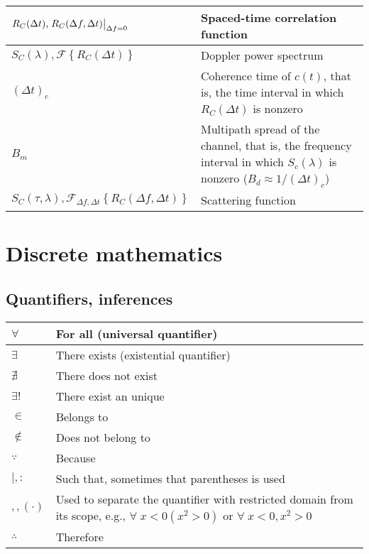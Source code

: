 \documentclass{article}
\begin{document}
\begin{xltabular}{\textwidth}{XX}
    \(R_C(\Delta t), \eval{R_C(\Delta f, \Delta t)}_{\Delta f = 0}\) & Spaced-time correlation function \\ \hline
    \(S_C(\lambda), \mathcal{F}\left\{ R_C (\Delta t) \right\}\) & Doppler power spectrum \\ \hline
    \((\Delta t)_c\) & Coherence time of \(c(t)\), that is, the time interval in which \(R_C(\Delta t)\) is nonzero \\ \hline
    \(B_m\) & Multipath spread of the channel, that is, the frequency interval in which \(S_c(\lambda)\) is nonzero (\(B_d \approx 1/(\Delta t)_c \)) \\ \hline
    \(S_C(\tau, \lambda), \mathcal{F}_{\Delta f, \Delta t}\left\{ R_C (\Delta f, \Delta t) \right\}\) & Scattering function \\ \hline
\end{xltabular}

\section{Discrete mathematics}
\subsection{Quantifiers, inferences}
\begin{xltabular}{\textwidth}{XX}
    \(\forall\) & For all (universal quantifier) \cite{grahamConcreteMathematicsFoundation1989}\\ \hline
    \(\exists\) & There exists (existential quantifier) \cite{grahamConcreteMathematicsFoundation1989}\\ \hline
    \(\nexists\) & There does not exist \cite{grahamConcreteMathematicsFoundation1989}\\ \hline
    \(\exists!\) & There exist an unique \cite{grahamConcreteMathematicsFoundation1989}\\ \hline
    \(\in\) & Belongs to \cite{grahamConcreteMathematicsFoundation1989}\\ \hline
    \(\not\in\) & Does not belong to \cite{grahamConcreteMathematicsFoundation1989}\\ \hline
    \(\because\) & Because \cite{grahamConcreteMathematicsFoundation1989}\\ \hline
    \(\mid, :\) & Such that, sometimes that parentheses is used \cite{grahamConcreteMathematicsFoundation1989}\\ \hline
    \(, , \left( \cdot \right)\) & Used to separate the quantifier with restricted domain from its scope, e.g., \(\forall \; x < 0 \left( x^{2} > 0 \right)\) or \(\forall \; x < 0, x^{2} > 0\) \cite{grahamConcreteMathematicsFoundation1989}\\ \hline
    \(\therefore\) & Therefore \cite{grahamConcreteMathematicsFoundation1989}\\
\end{xltabular}
\end{document}
